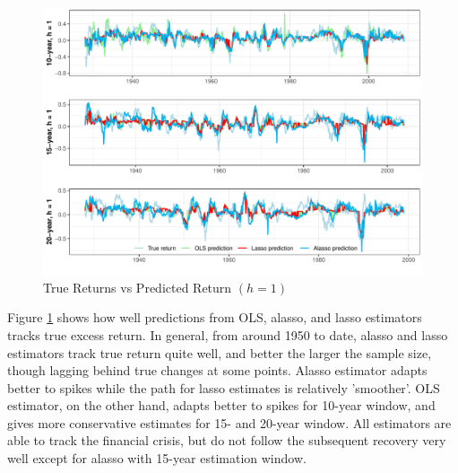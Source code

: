 \documentclass[12pt,a4paper]{article}
\begin{document}
\begin{figure}
\begin{center}
		\caption{True Returns vs Predicted Return $(h = 1)$}
		\label{fig:2} 
		\includegraphics[scale = 0.695]{prediction_graph.pdf}
\end{center}
\end{figure}

Figure \ref{fig:2} shows how well predictions from OLS, alasso, and lasso estimators tracks true excess return. In general, from around 1950 to date, alasso and lasso estimators track true return quite well, and better the larger the sample size, though lagging behind true changes at some points. Alasso estimator adapts better to spikes while the path for lasso estimates is relatively 'smoother'. OLS estimator, on the other hand, adapts better to spikes for 10-year window, and gives more conservative estimates for 15- and 20-year window. All estimators are able to track the financial crisis, but do not follow the subsequent recovery very well except for alasso with 15-year estimation window. 
\end{document}
